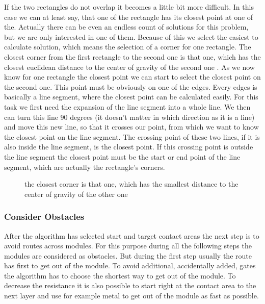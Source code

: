 If the two rectangles do not overlap it becomes a little bit more difficult. In this case we can at least say, that one of the rectangle has its closest point at one of the. Actually there can be even an endless count of solutions for this problem, but we are only interested in one of them. Because of this we select the easiest to calculate solution, which means the selection of a corner for one rectangle. The closest corner from the first rectangle to the second one is that one, which has the closest euclidean distance to the center of gravity of the second one . As we now know for one rectangle the closest point we can start to select the closest point on the second one. This point must be obviously on one of the edges. Every edges is basically a line segment, where the closest point can be calculated easily. For this task we first need the expansion of the line segment into a whole line. We then can turn this line 90 degrees (it doesn't matter in which direction as it is a line) and move this new line, so that it crosses our point, from which we want to know the closest point on the line segment. The crossing point of these two lines, if it is also inside the line segment, is the closest point. If this crossing point is outside the line segment the closest point must be the start or end point of the line segment, which are actually the rectangle's corners.

\begin{figure}
	\centering
	
  	\caption{the closest corner is that one, which has the smallest distance to the center of gravity of the other one}
	\label{fig:rectangles_closest_corner}
\end{figure}

\subsubsection{Consider Obstacles}
After the algorithm has selected start and target contact areas the next step is to avoid routes across modules. For this purpose during all the following steps the modules are considered as obstacles. But during the first step usually the route has first to get out of the module. To avoid additional, accidentally added, gates the algorithm has to choose the shortest way to get out of the module. To decrease the resistance it is also possible to start right at the contact area to the next layer and use for example metal to get out of the module as fast as possible.

